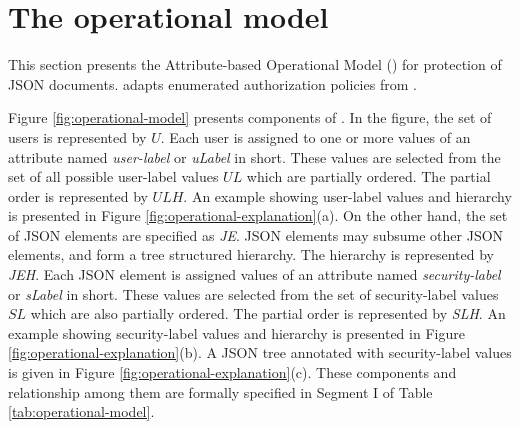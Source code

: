 

\section{The operational model}





\label{sec:operational-model}


This section presents the Attribute-based Operational Model (\atom{}) for protection of JSON documents. \atom{} adapts enumerated authorization policies from  \cite{labac,eap-abac}.





Figure \ref{fig:operational-model} presents components of \atom{}. In the figure, the set of users is represented by $U$. Each user is assigned to one or more values of an attribute named \textit{user-label} or \textit{uLabel} in short. These values are selected from the set of all possible user-label values $UL$ which are partially ordered. The partial order is represented by $ULH$. An example showing user-label values and  hierarchy is presented in Figure \ref{fig:operational-explanation}(a). On the other hand, the set of JSON elements are specified as \textit{JE}. JSON elements may subsume other JSON elements, and form a tree structured hierarchy. The hierarchy is represented by \textit{JEH}. Each JSON element is assigned values of an attribute named \textit{security-label} or \textit{sLabel} in short. These values are selected from the set of security-label values $SL$ which are also partially ordered. The partial order is represented by \textit{SLH}. An example showing security-label values and  hierarchy is presented in Figure \ref{fig:operational-explanation}(b). A JSON tree annotated with security-label values is given in Figure \ref{fig:operational-explanation}(c). These components and relationship among them are formally specified in Segment I of Table  \ref{tab:operational-model}.



